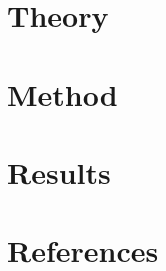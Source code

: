 \documentclass[14pt]{extarticle}
\begin{document}
%

{}
\tableofcontents

\newpage
{}
%
\setcounter{page}{1}

%

\newpage


\newpage
\section*{Theory}



\newpage
\section*{Method}


\newpage
\section*{Results}

\newpage

\newpage


%

\newpage
\section{References}
\printbibliography[heading=none]
%
\end{document}
